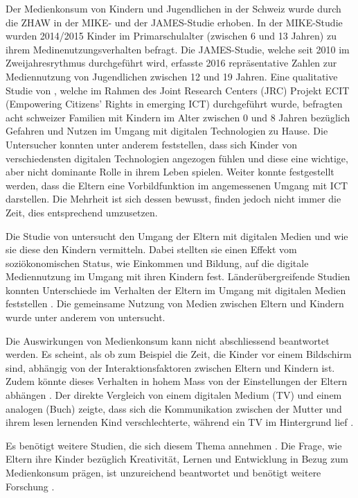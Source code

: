 Der Medienkonsum von Kindern und Jugendlichen in der Schweiz wurde durch die ZHAW in der MIKE- und der JAMES-Studie \cite{Suter2015, Waller2016} erhoben. In der MIKE-Studie wurden 2014/2015 Kinder im Primarschulalter (zwischen 6 und 13 Jahren) zu ihrem Medinenutzungsverhalten befragt. Die JAMES-Studie, welche seit 2010 im Zweijahresrythmus durchgeführt wird, erfasste 2016 repräsentative Zahlen zur Mediennutzung von Jugendlichen zwischen 12 und 19 Jahren. Eine qualitative Studie von , welche im Rahmen des Joint Research Centers (JRC) Projekt ECIT (Empowering Citizens' Rights in emerging ICT) durchgeführt wurde, befragten acht schweizer Familien mit Kindern im Alter zwischen 0 und 8 Jahren bezüglich Gefahren und Nutzen im Umgang mit digitalen Technologien zu Hause. Die Untersucher konnten unter anderem feststellen, dass sich Kinder von verschiedensten digitalen Technologien angezogen fühlen und diese eine wichtige, aber nicht dominante Rolle in ihrem Leben spielen. Weiter konnte festgestellt werden, dass die Eltern eine Vorbildfunktion im angemessenen Umgang mit ICT darstellen. Die Mehrheit ist sich dessen bewusst, finden jedoch nicht immer die Zeit, dies entsprechend umzusetzen. 

Die Studie von  untersucht den Umgang der Eltern mit digitalen Medien und wie sie diese den Kindern vermitteln. Dabei stellten sie einen Effekt vom soziökonomischen Status, wie Einkommen und Bildung, auf die digitale Mediennutzung im Umgang mit ihren Kindern fest. Länderübergreifende Studien konnten Unterschiede im Verhalten der Eltern im Umgang mit digitalen Medien feststellen \cite{Helsper2013}. Die gemeinsame Nutzung von Medien zwischen Eltern und Kindern wurde unter anderem von  untersucht. 

Die Auswirkungen von Medienkonsum kann nicht abschliessend beantwortet werden. Es scheint, als ob zum Beispiel die Zeit, die Kinder vor einem Bildschirm sind, abhängig von der Interaktionsfaktoren zwischen Eltern und Kindern ist. Zudem könnte dieses Verhalten in hohem Mass von der Einstellungen der Eltern abhängen \cite{Lauricella2015}. Der direkte Vergleich von einem digitalen Medium (TV) und einem analogen (Buch) zeigte, dass sich die Kommunikation zwischen der Mutter und ihrem lesen lernenden Kind verschlechterte, während ein TV im Hintergrund lief \cite{Nathanson2011}.

Es benötigt weitere Studien, die sich diesem Thema annehmen \cite{Wartella2016}. Die Frage, wie Eltern ihre Kinder bezüglich Kreativität, Lernen und Entwicklung in Bezug zum Medienkonsum prägen, ist unzureichend beantwortet und benötigt weitere Forschung \cite{AmericanAcademyofPediatrics2011,Troseth2016}. 

